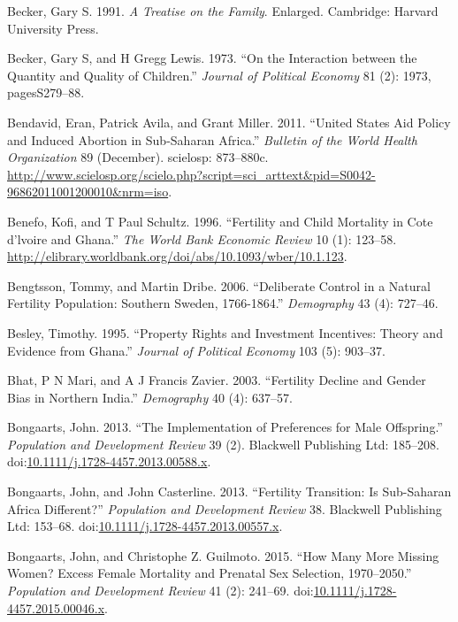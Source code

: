 \documentclass[]{article}
\begin{document}
\hypertarget{ref-becker91}{}
Becker, Gary S. 1991. \emph{A Treatise on the Family}. Enlarged. Cambridge: Harvard University Press.

\hypertarget{ref-becker73}{}
Becker, Gary S, and H Gregg Lewis. 1973. ``On the Interaction between the Quantity and Quality of Children.'' \emph{Journal of Political Economy} 81 (2): 1973, pagesS279--88.

\hypertarget{ref-Bendavid2011}{}
Bendavid, Eran, Patrick Avila, and Grant Miller. 2011. ``United States Aid Policy and Induced Abortion in Sub-Saharan Africa.'' \emph{Bulletin of the World Health Organization} 89 (December). scielosp: 873--880c. \url{http://www.scielosp.org/scielo.php?script=sci_arttext\&pid=S0042-96862011001200010\&nrm=iso}.

\hypertarget{ref-Benefo1996}{}
Benefo, Kofi, and T Paul Schultz. 1996. ``Fertility and Child Mortality in Cote d'lvoire and Ghana.'' \emph{The World Bank Economic Review} 10 (1): 123--58. \url{http://elibrary.worldbank.org/doi/abs/10.1093/wber/10.1.123}.

\hypertarget{ref-bengtsson06}{}
Bengtsson, Tommy, and Martin Dribe. 2006. ``Deliberate Control in a Natural Fertility Population: Southern Sweden, 1766-1864.'' \emph{Demography} 43 (4): 727--46.

\hypertarget{ref-besley95c}{}
Besley, Timothy. 1995. ``Property Rights and Investment Incentives: Theory and Evidence from Ghana.'' \emph{Journal of Political Economy} 103 (5): 903--37.

\hypertarget{ref-bhat03}{}
Bhat, P N Mari, and A J Francis Zavier. 2003. ``Fertility Decline and Gender Bias in Northern India.'' \emph{Demography} 40 (4): 637--57.

\hypertarget{ref-Bongaarts2013}{}
Bongaarts, John. 2013. ``The Implementation of Preferences for Male Offspring.'' \emph{Population and Development Review} 39 (2). Blackwell Publishing Ltd: 185--208. doi:\href{https://doi.org/10.1111/j.1728-4457.2013.00588.x}{10.1111/j.1728-4457.2013.00588.x}.

\hypertarget{ref-Bongaarts2013a}{}
Bongaarts, John, and John Casterline. 2013. ``Fertility Transition: Is Sub-Saharan Africa Different?'' \emph{Population and Development Review} 38. Blackwell Publishing Ltd: 153--68. doi:\href{https://doi.org/10.1111/j.1728-4457.2013.00557.x}{10.1111/j.1728-4457.2013.00557.x}.

\hypertarget{ref-Bongaarts2015}{}
Bongaarts, John, and Christophe Z. Guilmoto. 2015. ``How Many More Missing Women? Excess Female Mortality and Prenatal Sex Selection, 1970--2050.'' \emph{Population and Development Review} 41 (2): 241--69. doi:\href{https://doi.org/10.1111/j.1728-4457.2015.00046.x}{10.1111/j.1728-4457.2015.00046.x}.
\end{document}
